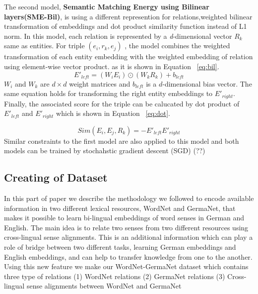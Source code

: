 \documentclass[11pt]{article}
\begin{document}
    The second model, \textbf{Semantic Matching Energy using Bilinear layers(SME-Bil)}, 
    is using a different represention for relations,weighted bilinear transformation of embeddings 
    and  dot product similarity function instead of L1 norm. 
    In this model, each relation is represented by a \textit{d}-dimensional vector $R_{k}$ same as entities. 
    For triple $(e_{i},r_{k} , e_{j} )$ , the model combines the weighted transformation of each entity embedding with 
    the weighted embedding of relation using element-wise vector product. as it is shown in Equation ~\eqref{eq:bil}.
    \begin{equation}
    \label{eq:bil} E'_{left} = (W_{i} E_{i}) \odot (W_{k} R_{k}) + b_{left}
    \end{equation}
    $W_{i}$ and $W_{k}$ are $d \times d$ weight matrices and $b_{left}$ is a $d$-dimensional bias vector. 
    The same equation holds for transforming the right entity embeddings to $E'_{right}$. Finally, the associated score for the triple
     can be calucated by dot product of $E'_{left}$ and $E'_{right}$ which is shown in Equation ~\ref{eq:dot}.
    
   \begin{equation}
    \label{eq:dot} Sim(E_{i}, E_{j}, R_{k}) = -E'_{left}E'_{right}
   \end{equation}
    Similar constraints to the first model are also applied to this model and 
     both models can be trained by stochahstic gradient descent (SGD) (??)
    
  
  \subsection{Creating of Dataset}
\label{ssec:dataset}

In this part of paper we describe the methodology we followed to encode available information 
in two different lexical resources, WordNet and GermaNet, that makes it possible to learn bi-lingual 
embeddings of word senses in German and English.  
The main idea is to relate two senses from two different resources using cross-lingual sense alignments.
This is an additional information which can play a role of bridge between two
different tasks, learning German embeddings and English embeddings, and can help to transfer knowledge from one to the another.
Using this new feature we make our WordNet-GermaNet dataset which contains three type of relations 
(1) WordNet relations 
(2) GermaNet relations
(3) Cross-lingual sense alignments between WordNet and GermaNet
\end{document}
